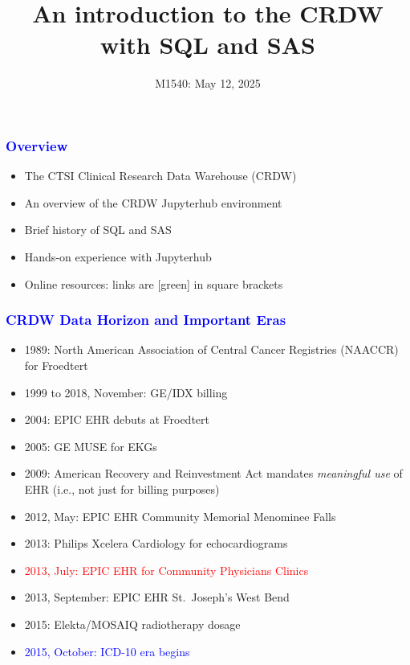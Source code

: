 \documentclass[11pt,pdftex,dvipsnames,usenames]{beamer}
\title{An introduction to the CRDW with SQL and SAS}
\date{M1540: May 12, 2025}
\begin{document}


\titlepage
\boldmath

 
\begin{frame}[fragile]\frametitle{\bf\textcolor{blue}{Overview}}
\begin{itemize}
\item The CTSI Clinical Research Data Warehouse (CRDW)
\item An overview of the CRDW Jupyterhub environment 
\item Brief history of SQL and SAS
\item Hands-on experience with Jupyterhub %
\item Online resources: 
links are  \textcolor{PineGreen}{[green]} in square brackets
\end{itemize}
\end{frame}


\begin{frame}[fragile]\frametitle{\bf\textcolor{blue}{CRDW Data Horizon
and Important Eras}}

\begin{itemize}
\item 1989: North American Association of Central Cancer Registries
  (NAACCR) for Froedtert %
\item 1999 to 2018, November: GE/IDX billing
\item 2004: EPIC EHR debuts at Froedtert
\item 2005: GE MUSE for EKGs
\item 2009: American Recovery and Reinvestment Act mandates {\it meaningful use} of EHR (i.e., not just for billing purposes)
\item 2012, May: EPIC EHR Community Memorial Menominee Falls
\item 2013: Philips Xcelera Cardiology for echocardiograms
\item \textcolor{red}{2013, July: EPIC EHR for Community Physicians Clinics} 
\item 2013, September: EPIC EHR St.\ Joseph's West Bend
\item 2015: Elekta/MOSAIQ radiotherapy dosage
\item \textcolor{blue}{2015, October: ICD-10 era begins}
\end{itemize}

\end{frame}
\end{document}
